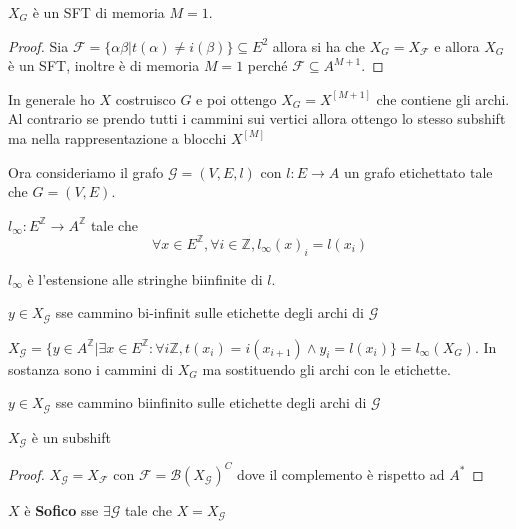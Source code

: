 \begin{teorema}
    $X_G$ è un SFT di memoria $M=1$.
    \begin{proof}
        Sia $\mathcal{F}= \{\alpha\beta|t(\alpha) \ne i(\beta)\}\subseteq E^2$ allora 
        si ha che $X_G= X_\mathcal{F}$ e allora $X_G$ è un SFT, inoltre è di memoria 
        $M=1$  perché $\mathcal{F}\subseteq A^{M+1}$.
    \end{proof}
\end{teorema}
In generale ho $X$ costruisco $G$ e poi ottengo $X_G = X^{[M+1]}$ che contiene gli 
archi. Al contrario se prendo tutti i cammini sui vertici allora ottengo lo stesso
subshift ma nella rappresentazione a blocchi $X^{[M]}$

Ora consideriamo il grafo $\mathcal{G}=(V,E,l)$ con $l:E\to A$ un grafo etichettato 
tale che $G=(V,E)$.
\begin{definizione}
    $l_\infty:E^\mathbb{Z}\to A^\mathbb{Z}$ tale che 
    $$\forall x\in E^\mathbb{Z}, \forall i \in \mathbb{Z}, l_\infty(x)_i = l(x_i)$$
\end{definizione}
\begin{nota}
    $l_\infty$ è l'estensione alle stringhe biinfinite di $l$.
\end{nota}
\begin{nota}
    $y\in X_\mathcal{G}$ sse cammino bi-infinit sulle etichette degli archi di $\mathcal{G}$
\end{nota}

\begin{definizione}
    $X_\mathcal{G}= \{y\in A^\mathbb{Z}|\exists x\in E^\mathbb{Z} : \forall i \mathbb{Z}, t(x_i) = i(x_{i+1})\land y_i=l(x_i)\}=l_\infty(X_G)$.
    In sostanza sono i cammini di $X_G$ ma sostituendo gli archi con le etichette.
    
\end{definizione}

\begin{osservazione}
    $y\in X_\mathcal{G}$ sse cammino biinfinito sulle etichette degli archi di $\mathcal{G}$
\end{osservazione}
\begin{nota}
    $X_\mathcal{G}$ è un subshift
    \begin{proof}
        $X_\mathcal{G} = X_\mathcal{F}$ con $\mathcal{F}=\mathcal{B}(X_\mathcal{G})^C$
        dove il complemento è rispetto ad $A^\ast$
    \end{proof}
\end{nota}


\begin{definizione}
    $X$ è \textbf{Sofico} sse $\exists \mathcal{G}$ tale che $X= X_\mathcal{G}$
\end{definizione}

